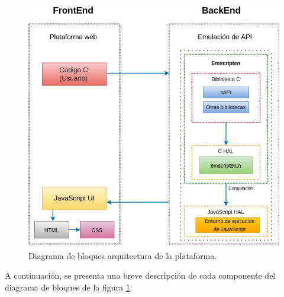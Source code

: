 \hfill \break
\hfill \break
\hfill \break
\hfill \break
\hfill \break
\hfill \break
\hfill \break
\hfill \break
\hfill \break
\hfill \break
\hfill \break
\hfill \break
\hfill \break
\hfill \break
\hfill \break
\hfill \break

\begin{figure}[ht]
	\centering
	\includegraphics[scale=.55]{./Figures/Arquitectura.png}
	\caption{Diagrama de bloques arquitectura de la plataforma.}
	\label{fig:Arquitectura}
\end{figure}

A continuación, se presenta una breve descripción de cada componente del diagrama de bloques de la figura \ref{fig:Arquitectura}:

